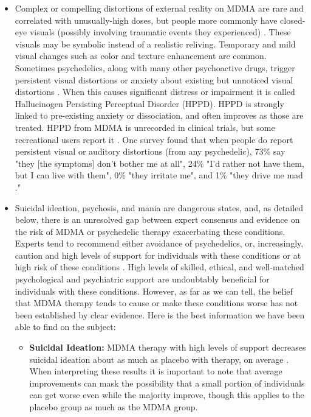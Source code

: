 \documentclass[12pt,letterpaper]{book}
\begin{document}
\begin{itemize}
    \item Complex or compelling distortions of external reality on MDMA are rare and correlated with unusually-high doses, but people more commonly have closed-eye visuals (possibly involving traumatic events they experienced) \cite{liechtiGender}. These visuals may be symbolic instead of a realistic reliving. Temporary and mild visual changes such as color and texture enhancement are common. Sometimes psychedelics, along with many other psychoactive drugs, trigger persistent visual distortions or anxiety about existing but unnoticed visual distortions \cite{alexanderHPPD,halpernHPPD}. When this causes significant distress or impairment it is called Hallucinogen Persisting Perceptual Disorder (HPPD). HPPD is strongly linked to pre-existing anxiety or dissociation, and often improves as those are treated. HPPD from MDMA is unrecorded in clinical trials, but some recreational users report it \cite{vizeliActuteEffects,litjensHPPD}. One survey found that when people do report persistent visual or auditory distortions (from any psychedelic), 73\% say "they [the symptoms] don't bother me at all", 24\% "I'd rather not have them, but I can live with them", 0\% "they irritate me", and 1\% "they drive me mad \cite{carhart2010user}."
    \item Suicidal ideation, psychosis, and mania are dangerous states, and, as detailed below, there is an unresolved gap between expert consensus and evidence on the risk of MDMA or psychedelic therapy exacerbating these conditions. Experts tend to recommend either avoidance of psychedelics, or, increasingly, caution and high levels of support for individuals with these conditions or at high risk of these conditions \cite{la2022Psychosis}. High levels of skilled, ethical, and well-matched psychological and psychiatric support are undoubtably beneficial for individuals with these conditions. However, as far as we can tell, the belief that MDMA therapy tends to cause or make these conditions worse has not been established by clear evidence. Here is the best information we have been able to find on the subject:
        \begin{itemize}
            \item \textbf{Suicidal Ideation:} MDMA therapy with high levels of support decreases suicidal ideation about as much as placebo with therapy, on average \cite{mitchellMDMAClinicalTrial,mitchellMDMAClinicalTrial2}. When interpreting these results it is important to note that average improvements can mask the possibility that a small portion of individuals can get worse even while the majority improve, though this applies to the placebo group as much as the MDMA group.

\end{itemize}
\end{itemize}
\end{document}
